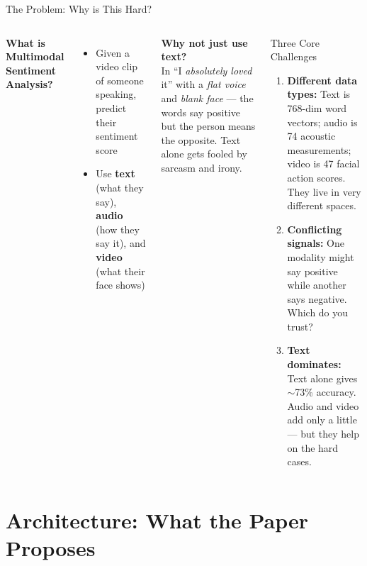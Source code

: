 \documentclass[aspectratio=169]{beamer}
\begin{document}
\begin{frame}{The Problem: Why is This Hard?}
  \begin{columns}[T]
      \textbf{What is Multimodal Sentiment Analysis?}
      \begin{itemize}
        \item Given a video clip of someone speaking, predict their sentiment score
        \item Use \textbf{text} (what they say), \textbf{audio} (how they say it),
          and \textbf{video} (what their face shows)
      \end{itemize}

      \vspace{6pt}
      \textbf{Why not just use text?}\\[3pt]
      In ``I \textit{absolutely loved} it'' with a \textit{flat voice} and
      \textit{blank face} — the words say positive but the person means the opposite.
      Text alone gets fooled by sarcasm and irony.

      \begin{alertblock}{Three Core Challenges}
        \begin{enumerate}
          \item \textbf{Different data types:} Text is 768-dim word vectors;
            audio is 74 acoustic measurements; video is 47 facial action scores.
            They live in very different spaces.
          \item \textbf{Conflicting signals:} One modality might say positive
            while another says negative. Which do you trust?
          \item \textbf{Text dominates:} Text alone gives $\sim$73\% accuracy.
            Audio and video add only a little — but they help on the hard cases.
        \end{enumerate}
      \end{alertblock}
  \end{columns}
\end{frame}

\section{Architecture: What the Paper Proposes}
\end{document}
